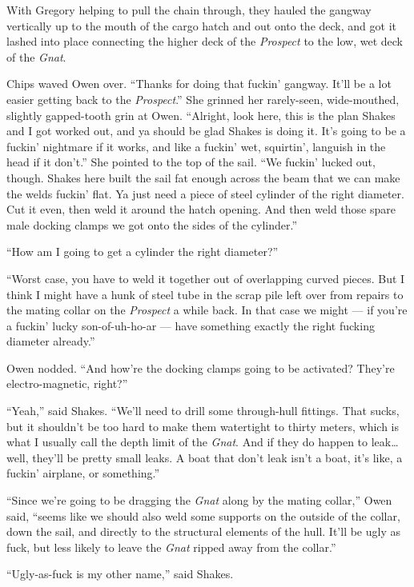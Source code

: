 \documentclass[
]{scrbook}
\begin{document}
With Gregory helping to pull the chain through, they hauled the gangway
vertically up to the mouth of the cargo hatch and out onto the deck, and
got it lashed into place connecting the higher deck of the
\emph{Prospect} to the low, wet deck of the \emph{Gnat}.

Chips waved Owen over. ``Thanks for doing that fuckin' gangway. It'll be
a lot easier getting back to the \emph{Prospect}.'' She grinned her
rarely-seen, wide-mouthed, slightly gapped-tooth grin at Owen.
``Alright, look here, this is the plan Shakes and I got worked out, and
ya should be glad Shakes is doing it. It's going to be a fuckin'
nightmare if it works, and like a fuckin' wet, squirtin', languish in
the head if it don't.'' She pointed to the top of the sail. ``We fuckin'
lucked out, though. Shakes here built the sail fat enough across the
beam that we can make the welds fuckin' flat. Ya just need a piece of
steel cylinder of the right diameter. Cut it even, then weld it around
the hatch opening. And then weld those spare male docking clamps we got
onto the sides of the cylinder.''

``How am I going to get a cylinder the right diameter?''

``Worst case, you have to weld it together out of overlapping curved
pieces. But I think I might have a hunk of steel tube in the scrap pile
left over from repairs to the mating collar on the \emph{Prospect} a
while back. In that case we might --- if you're a fuckin' lucky
son-of-uh-ho-ar --- have something exactly the right fucking diameter
already.''

Owen nodded. ``And how're the docking clamps going to be activated?
They're electro-magnetic, right?''

``Yeah,'' said Shakes. ``We'll need to drill some through-hull fittings.
That sucks, but it shouldn't be too hard to make them watertight to
thirty meters, which is what I usually call the depth limit of the
\emph{Gnat}. And if they do happen to leak\ldots well, they'll be pretty
small leaks. A boat that don't leak isn't a boat, it's like, a fuckin'
airplane, or something.''

``Since we're going to be dragging the \emph{Gnat} along by the mating
collar,'' Owen said, ``seems like we should also weld some supports on
the outside of the collar, down the sail, and directly to the structural
elements of the hull. It'll be ugly as fuck, but less likely to leave
the \emph{Gnat} ripped away from the collar.''

``Ugly-as-fuck is my other name,'' said Shakes.
\end{document}
